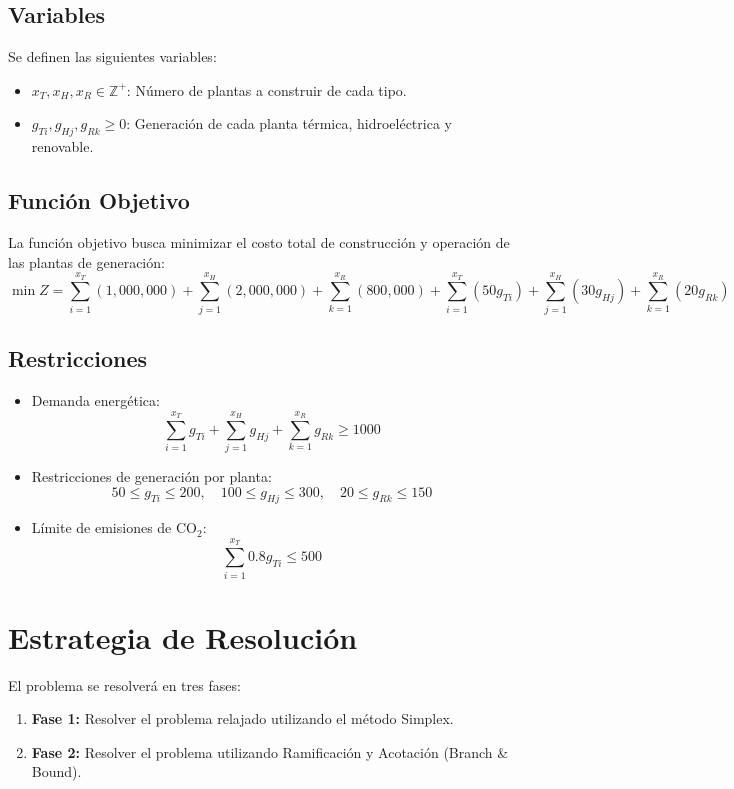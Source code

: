 \documentclass{article}
\begin{document}
\subsection*{Variables}
Se definen las siguientes variables:
\begin{itemize}[noitemsep]
    \item $x_T, x_H, x_R \in \mathbb{Z}^+$: Número de plantas a construir de cada tipo.
    \item $g_{Ti}, g_{Hj}, g_{Rk} \geq 0$: Generación de cada planta térmica, hidroeléctrica y renovable.
\end{itemize}

\subsection*{Función Objetivo}
La función objetivo busca minimizar el costo total de construcción y operación de las plantas de generación:
\[
\min Z = \sum_{i=1}^{x_T} (1,000,000) + \sum_{j=1}^{x_H} (2,000,000) + \sum_{k=1}^{x_R} (800,000) + \sum_{i=1}^{x_T} (50 g_{Ti}) + \sum_{j=1}^{x_H} (30 g_{Hj}) + \sum_{k=1}^{x_R} (20 g_{Rk})
\]

\subsection*{Restricciones}
\begin{itemize}[noitemsep]
    \item Demanda energética: 
    \[
    \sum_{i=1}^{x_T} g_{Ti} + \sum_{j=1}^{x_H} g_{Hj} + \sum_{k=1}^{x_R} g_{Rk} \geq 1000
    \]
    \item Restricciones de generación por planta:
    \[
    50 \leq g_{Ti} \leq 200, \quad 100 \leq g_{Hj} \leq 300, \quad 20 \leq g_{Rk} \leq 150
    \]
    \item Límite de emisiones de CO$_2$:
    \[
    \sum_{i=1}^{x_T} 0.8 g_{Ti} \leq 500
    \]
\end{itemize}

\section*{Estrategia de Resolución}
El problema se resolverá en tres fases:

\begin{enumerate}[noitemsep]
    \item \textbf{Fase 1:} Resolver el problema relajado utilizando el método Simplex.
    \item \textbf{Fase 2:} Resolver el problema utilizando Ramificación y Acotación (Branch \& Bound).
\end{enumerate}
\end{document}
